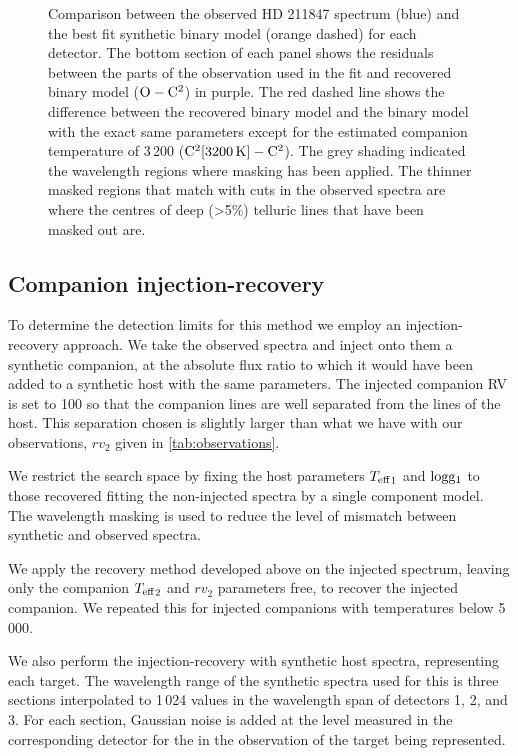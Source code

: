 \begin{figure*}
    \centering
    \caption{Comparison between the observed {HD 211847} spectrum (blue) and the best fit synthetic binary model (orange dashed) for each detector.
The bottom section of each panel shows the residuals between the parts of the observation used in the \textchisquared{} fit and recovered binary model (\(\rm O-C^2\)) in purple.
The red dashed line shows the difference between the recovered binary model and the binary model with the exact same parameters except for the estimated companion temperature of 3\,200\K{} (\(\rm C^2[3200\,\si{\kelvin}{}]- C^2\)).
The grey shading indicated the wavelength regions where masking has been applied.
The thinner masked regions that match with cuts in the observed spectra are where the centres of deep (>5\%) telluric lines that have been masked out are.}
    \label{fig:visualinspection-hd2118471}
\end{figure*}


\subsection{Companion injection-recovery}
\label{subsection:injection-recovery}
To determine the detection limits for this method we employ an injection-recovery approach.
We take the observed spectra and inject onto them a synthetic companion, at the absolute flux ratio to which it would have been added to a synthetic host with the same parameters.
The injected companion {RV} is set to 100\kmps{} so that the companion lines are well separated from the lines of the host.
This separation chosen is slightly larger than what we have with our observations, \(rv_2\) given in \cref{tab:observations}.

We restrict the search space by fixing the host parameters \({T_{\mathrm{eff}}}_{1}\) and \(\textrm{logg}{}_1\) to those recovered fitting the non-injected spectra by a single component model.
The wavelength masking is used to reduce the level of mismatch between synthetic and observed spectra.

We apply the recovery method developed above on the injected spectrum, leaving only the companion \({T_{\mathrm{eff}}}_{2}\) and \({rv}_2\) parameters free, to recover the injected companion.
We repeated this for injected companions with temperatures below 5\,000\K{}.

We also perform the injection-recovery with synthetic host spectra, representing each target.
The wavelength range of the synthetic spectra used for this is three sections interpolated to 1\,024 values in the wavelength span of detectors 1, 2, and 3.
For each section, Gaussian noise is added at the level measured in the corresponding detector for the in the observation of the target being represented.

